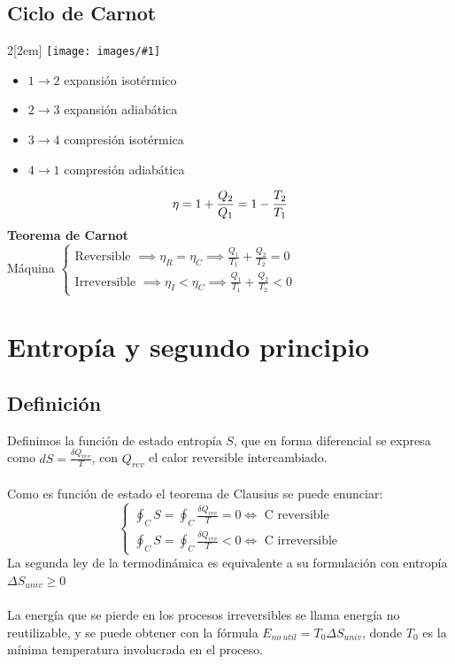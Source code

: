 \documentclass{myclass}
\newcommand{\incimg}[1]{%
    \texttt{[image: images/\#1]}
}
\begin{document}
\subsection{Ciclo de Carnot}
\begin{multicols}{2}[\columnsep2em]
    \incimg{CicloCarnot.png}
\columnbreak                                                                                                   
   \begin{itemize}
     \item $1\to 2$ expansión isotérmico
	 \item  $2\to 3$ expansión adiabática
	 \item  $3\to 4$ compresión isotérmica
   	 \item $4\to 1$ compresión adiabática
   \end{itemize}
   \[
  \eta = 1 + \frac{Q_2}{Q_1} = 1- \frac{T_2}{T_1} \\
   \] 
   \textbf{Teorema de Carnot}\\
   Máquina $\begin{cases}
     \text{Reversible } \implies \eta_R = \eta_C \implies \frac{Q_1}{T_1} + \frac{Q_2}{T_2} = 0 \\
     \text{Irreversible } \implies \eta_I < \eta_C \implies \frac{Q_1}{T_1} + \frac{Q_2}{T_2} < 0 
   \end{cases}$

\end{multicols}

\section{Entropía y segundo principio}
\subsection{Definición}
Definimos la función de estado entropía $S$, que en forma diferencial se expresa como $dS = \frac{\delta Q_{rev}}{T}$, con $Q_{rev}$ el calor reversible intercambiado. \\
\\
Como es función de estado el teorema de Clausius se puede enunciar:
\[
\begin{cases}
  \displaystyle\oint_C S = \oint_C \frac{\delta Q_{rev}}{T} = 0 \iff \text{ C reversible} \\
  \displaystyle\oint_C S = \oint_C \frac{\delta Q_{rev}}{T} <  0 \iff \text{ C irreversible}
\end{cases}
\] 
La segunda ley de la termodinámica es equivalente a su formulación con entropía $\boxed{\Delta S_{univ}\ge 0}$ \\
\\
La energía que se pierde en los procesos irreversibles se llama energía no reutilizable, y se puede obtener con la fórmula $E_{no\ util} = T_0\Delta S_{univ}$, donde $T_0$ es la mínima temperatura involucrada en el proceso.
\end{document}
